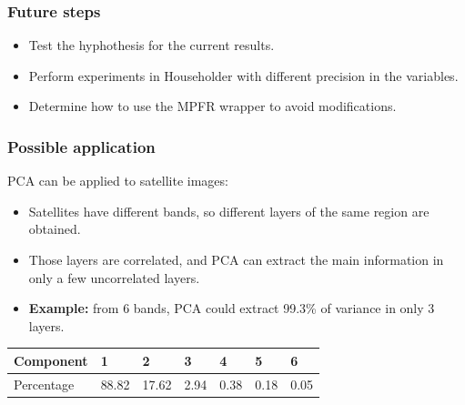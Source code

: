 \documentclass[serif, 12pt]{beamer}
\begin{document}

\begin{frame}
\frametitle{Future steps}

\begin{itemize}
\item Test the hyphothesis for the current results.
\item Perform experiments in Householder with different precision in the 
variables.
\item Determine how to use the MPFR wrapper to avoid modifications.
\end{itemize}

\end{frame}


\begin{frame}
\frametitle{Possible application}

PCA can be applied to satellite images:

\begin{itemize}
\item Satellites have different bands, so different layers of the same region 
are obtained.
\item Those layers are correlated, and PCA can extract the main information in 
only a few uncorrelated layers.
\item \textbf{Example:} from 6 bands, PCA could extract 99.3\% of variance in 
only 3 layers.
\end{itemize}

\begin{tabular}{l l l l l l l}
Component & 1 & 2 & 3 & 4 & 5 & 6 \\
\hline
Percentage & 88.82 & 17.62 & 2.94 & 0.38 & 0.18 & 0.05 \\
\end{tabular}

\end{frame}
\end{document}
